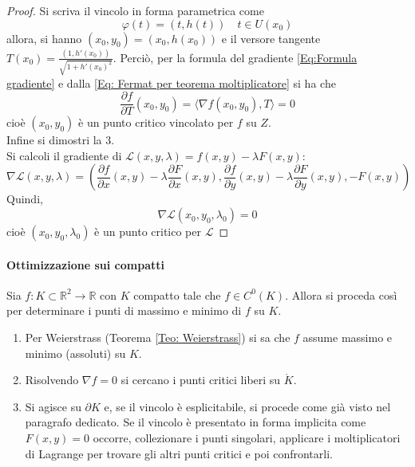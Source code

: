 \begin{proof}
    Si scriva il vincolo in forma parametrica come
    \begin{equation}
        \varphi(t)=(t, h(t)) \quad t \in U(x_0)
    \end{equation}
    allora, si hanno $(x_0, y_0)=(x_0, h(x_0))$ e il versore tangente $T(x_0)=\tfrac{(1, h'(x_0))}{\sqrt{1+h'(x_0)^2}}$.
    Perciò, per la formula del gradiente \eqref{Eq:Formula gradiente}
    e dalla \eqref{Eq: Fermat per teorema moltiplicatore}
    si ha che
    \begin{equation}
        \frac{\partial{f}}{\partial{T}}(x_0, y_0)= \langle \nabla f(x_0, y_0), T\rangle = 0
    \end{equation}
    cioè $(x_0, y_0)$ è un punto critico vincolato per $f$ su $Z$.\\
    Infine si dimostri la 3.\\
    Si calcoli il gradiente di $\mathcal{L}(x, y, \lambda)=f(x, y)-\lambda F(x, y)$:
    \begin{equation}
        \nabla \mathcal{L}(x,y,\lambda)=\left(\frac{\partial{f}}{\partial{x}}(x, y)-\lambda \frac{\partial{F}}{\partial{x}}(x, y), \frac{\partial{f}}{\partial{y}}(x, y)-\lambda \frac{\partial{F}}{\partial{y}}(x, y), -F(x, y)\right)
    \end{equation}
    Quindi,
    \begin{equation}
     \nabla \mathcal{L}(x_0, y_0, \lambda_0)=0   
    \end{equation}
    cioè $(x_0, y_0, \lambda_0)$ è un punto critico per $\mathcal{L}$
\end{proof}
\paragraph{Ottimizzazione sui compatti}
Sia $f: K \subset \mathbb{R}^2 \to \mathbb{R}$ con $K$ compatto tale che $f \in C^0(K)$. Allora si proceda così per determinare i punti di massimo e minimo di $f$ su $K$.
\begin{enumerate}
    \item Per Weierstrass (Teorema \ref{Teo: Weierstrass}) si sa che $f$ assume massimo e minimo (assoluti) su $K$.
    \item Risolvendo $\nabla f=0$ si cercano i punti critici liberi su $\mathring{K}$.
    \item Si agisce su $\partial K$ e, se il vincolo è esplicitabile, si procede come già visto nel paragrafo dedicato. Se il vincolo è presentato in forma implicita come $F(x,y)=0$ occorre, collezionare i punti singolari, applicare i moltiplicatori di Lagrange per trovare gli altri punti critici e poi confrontarli.
\end{enumerate}